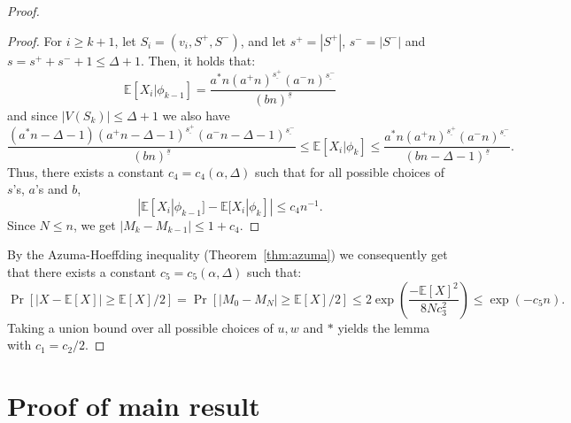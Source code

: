 \documentclass[10pt, a4paper]{article}
\theoremstyle{remark}
\newcommand*{\E}{\ensuremath{\mathbb{E}}}
\begin{document}
\begin{proof}
\begin{proof}
        For $i \geq k+1$, let $S_i = (v_i, S^+, S^-)$, and let $ s^+ = |S^+|$, $ s^-=|S^-|$ and $s = s^+ + s^- + 1 \leq \Delta + 1$. 
        Then, it holds that:
        \[\E[X_i | \phi_{k-1}] = \frac{a^*n (a^+n)^{\underline{s^+}}(a^-n)^{\underline{s^-}}}{(b n)^{\underline{s}}} \]
        and since $|V(S_k)| \leq \Delta + 1$ we also have
        \[\frac{(a^*n - \Delta - 1)(a^+n- \Delta - 1)^{\underline{s^+}}(a^-n- \Delta - 1)^{\underline{s^-}}}{(b n)^{\underline{s}}} \leq \E[X_i | \phi_{k}] \leq \frac{a^*n (a^+n)^{\underline{s^+}}(a^-n)^{\underline{s^-}}}{(b n - \Delta - 1)^{\underline{s}}}.\]
        Thus, there exists a constant $c_4 = c_4(\alpha, \Delta)$ such that for all possible choices of $s$'s, $a$'s and $b$,
        \[|\E[X_i | \phi_{k-1}] - \E[X_i| \phi_{k}]| \leq c_4n^{-1}. \]
        Since $N \leq n$, we get $|M_{k} - M_{k-1}| \leq  1 + c_4$.
    \end{proof}
    \vspace{10pt}

    By the Azuma-Hoeffding inequality (Theorem~\ref{thm:azuma}) we consequently get that there exists a constant $c_5 = c_5(\alpha, \Delta)$ such that:
    \[ \Pr[|X - \E[X]| \geq \E[X]/2] = \Pr[|M_0 - M_N| \geq \E[X]/2] \leq 2 \exp(\frac{-\E[X]^2}{8N c_3^2}) \leq  \exp(-c_5n).\]
    Taking a union bound over all possible choices of $u, w$ and $*$ yields the lemma with $c_1 = c_2/2$. 
\end{proof}

\section{Proof of main result}
\label{section:proofofmain}
\end{document}
